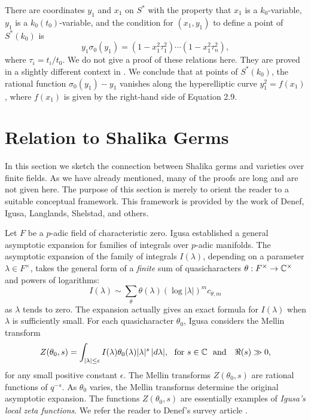 \documentclass{amsart}
\begin{document}
There are coordinates $y_1$ and $x_1$ on $S^*$ with the property
that $x_1$ is a $k_0$-variable, $y_1$ is a $k_0(t_0)$-variable,
and the condition for $(x_1,y_1)$ to define a point of $S^*(k_0)$
is 
\begin{equation}\tag{2.9}
y_1 \sigma_0(y_1) = (1- x_1^2 \tau_1^2)\cdots (1-x_1^2 \tau_n^2),
\end{equation}
where $\tau_i = t_i/t_0$.  We do not give a proof of these relations here.
They are proved in a slightly different context in \cite{H5,1.2}.
We conclude that at points of $S^*(k_0)$, the rational function
$\sigma_0(y_1) - y_1$ 
vanishes along the hyperelliptic
curve $y_1^2 = f(x_1)$, where $f(x_1)$ is given by the
right-hand side of Equation 2.9.
\endproclaim

\section{Relation to Shalika Germs}

In this section we sketch the connection between Shalika germs and
varieties over finite fields.  As we have already mentioned, many of the
proofs are long and are not given here.  The purpose of this section
is merely to orient the reader to a suitable
conceptual framework.  This
framework is provided by the work of Denef,
Igusa, Langlands, Shelstad, and others.

Let $F$ be a $p$-adic field of characteristic zero.  Igusa \cite{I}
established
a general
asymptotic expansion for
families of  integrals over $p$-adic
manifolds.
The asymptotic expansion of the family of integrals $I(\lambda)$,
depending on a parameter $\lambda\in F^\times$,
takes  the general
form of a {\it finite} sum of quasicharacters 
$\theta:F^\times\to {\Bbb C}^\times$ and powers of logarithms:
$$I(\lambda) \sim \sum_\theta \theta(\lambda) (\log|\lambda|)^m
c_{\theta,m}$$
as $\lambda$ tends to zero.
The expansion actually gives an exact formula for $I(\lambda)$
when $\lambda$ is  sufficiently small.
For each quasicharacter
$\theta_0$, Igusa considers
the Mellin transform 
$$Z(\theta_0,s)= 
     \int_{|\lambda|\le \epsilon} I(\lambda) \theta_0(\lambda)|\lambda|^s 
    \,|d\lambda|,\ \ \hbox{for } s\in{\Bbb C}\ \ \hbox{and}\quad  \Re(s)\gg 0,$$
for any small positive constant $\epsilon$.
The Mellin transforms $Z(\theta_0,s)$ are rational functions of 
$q^{-s}$.  As $\theta_0$ varies, the Mellin transforms determine
the original asymptotic expansion.
The functions $Z(\theta_0,s)$ are essentially
examples of {\it Igusa's  
local zeta functions}.
We refer the reader to Denef's survey article \cite{D2}.
\end{document}
